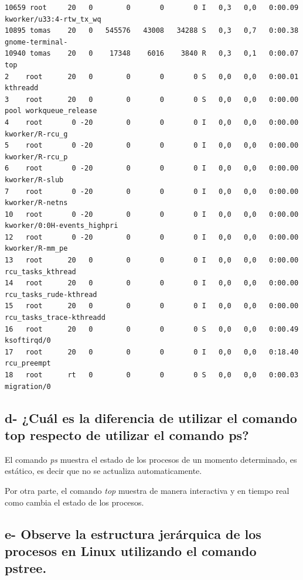 \documentclass{article}
\begin{document}
\begin{commandline}
{\begin{verbatim}
10659 root     20   0        0       0       0 I   0,3   0,0   0:00.09  kworker/u33:4-rtw_tx_wq
10895 tomas    20   0   545576   43008   34288 S   0,3   0,7   0:00.38  gnome-terminal-
10940 tomas    20   0    17348    6016    3840 R   0,3   0,1   0:00.07  top
2    root      20   0        0       0       0 S   0,0   0,0   0:00.01  kthreadd 
3    root      20   0        0       0       0 S   0,0   0,0   0:00.00  pool workqueue_release
4    root       0 -20        0       0       0 I   0,0   0,0   0:00.00  kworker/R-rcu_g
5    root       0 -20        0       0       0 I   0,0   0,0   0:00.00  kworker/R-rcu_p
6    root       0 -20        0       0       0 I   0,0   0,0   0:00.00  kworker/R-slub
7    root       0 -20        0       0       0 I   0,0   0,0   0:00.00  kworker/R-netns
10   root       0 -20        0       0       0 I   0,0   0,0   0:00.00  kworker/0:0H-events_highpri
12   root       0 -20        0       0       0 I   0,0   0,0   0:00.00  kworker/R-mm_pe
13   root      20   0        0       0       0 I   0,0   0,0   0:00.00  rcu_tasks_kthread
14   root      20   0        0       0       0 I   0,0   0,0   0:00.00  rcu_tasks_rude-kthread
15   root      20   0        0       0       0 I   0,0   0,0   0:00.00  rcu_tasks_trace-kthreadd
16   root      20   0        0       0       0 S   0,0   0,0   0:00.49  ksoftirqd/0
17   root      20   0        0       0       0 I   0,0   0,0   0:18.40  rcu_preempt
18   root      rt   0        0       0       0 S   0,0   0,0   0:00.03  migration/0
\end{verbatim}
}
\end{commandline}

\subsection*{d- ¿Cuál es la diferencia de utilizar el comando top respecto de utilizar el comando ps?}

\noindent
El comando \textit{ps} muestra el estado de los procesos de un momento determinado, es estático, es decir que no se actualiza automaticamente.

\noindent
Por otra parte, el comando \textit{top} muestra de manera interactiva y en tiempo real como cambia el estado de los procesos.

\subsection*{e- Observe la estructura jerárquica de los procesos en Linux utilizando el comando pstree.}
\end{document}

